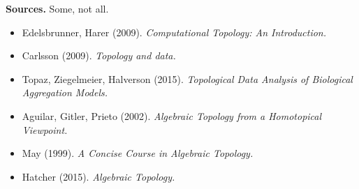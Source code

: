 \documentclass[10pt]{article}
\begin{document}
\vspacing

\noindent
\textbf{Sources.} Some, not all.
\begin{itemize}
\item Edelsbrunner, Harer (2009). \textit{Computational Topology: An Introduction.}
\item Carlsson (2009). \textit{Topology and data.}
\item Topaz, Ziegelmeier, Halverson (2015). \textit{Topological Data Analysis of Biological Aggregation Models.}
\item Aguilar, Gitler, Prieto (2002). \textit{Algebraic Topology from a Homotopical Viewpoint.}
\item May (1999). \textit{A Concise Course in Algebraic Topology.}
\item Hatcher (2015). \textit{Algebraic Topology.}
\end{itemize}

\noindent
\end{document}
